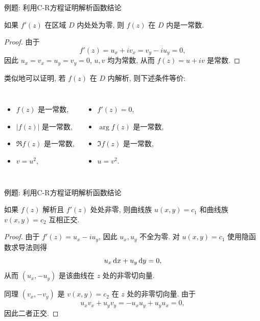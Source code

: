 \begin{frame}[<*>]{例题: 利用C-R方程证明解析函数结论}
\onslide<+->
\begin{example}
如果 $f'(z)$ 在区域 $D$ 内处处为零, 则 $f(z)$ 在 $D$ 内是一常数.
\end{example}
\onslide<+->
\begin{proof}
由于
\vspace{-\baselineskip}
\[f'(z)=u_x+iv_x=v_y-iu_y=0,\]
\onslide<+->
因此 $u_x=v_x=u_y=v_y=0$, $u,v$ 均为常数, 
\onslide<+->
从而 $f(z)=u+iv$ 是常数.
\end{proof}
\onslide<+->
类似地可以证明, 若 $f(z)$ 在 $D$ 内解析, 则下述条件等价:
\onslide<+->
\begin{columns}
		\begin{itemize}
		\item $f(z)$ 是一常数,
		\item $|f(z)|$ 是一常数,
		\item $\Re{f(z)}$ 是一常数,
		\item $v=u^2$,
		\end{itemize}
		\onslide<+->
		\begin{itemize}
		\item $f'(z)=0$,
		\item $\arg{f(z)}$ 是一常数,
		\item $\Im{f(z)}$ 是一常数,
		\item $u=v^2$.
		\end{itemize}
\end{columns}
\end{frame}


\begin{frame}{例题: 利用C-R方程证明解析函数结论}
\beqskip{5pt}
\begin{example}
如果 $f(z)$ 解析且 $f'(z)$ 处处非零, 则曲线族 $u(x,y)=c_1$ 和曲线族 $v(x,y)=c_2$ 互相正交.
\end{example}
\begin{proof}
\indent
由于 $f'(z)=u_x-iu_y$, 因此 $u_x,u_y$ 不全为零.
\onslide<+->
对 $u(x,y)=c_1$ 使用隐函数求导法则得
\[u_x\,\mathrm{d} x+u_y\,\mathrm{d} y=0,\]
\onslide<+->
从而 $(u_x,-u_y)$ 是该曲线在 $z$ 处的非零切向量.

\indent
\onslide<+->
同理 $(v_x,-v_y)$ 是 $v(x,y)=c_2$ 在 $z$ 处的非零切向量.
\onslide<+->
由于
\[u_xv_x+u_yv_y=-u_xu_y+u_yu_x=0,\]
\onslide<+->
因此二者正交.
\end{proof}
\endgroup
\end{frame}


